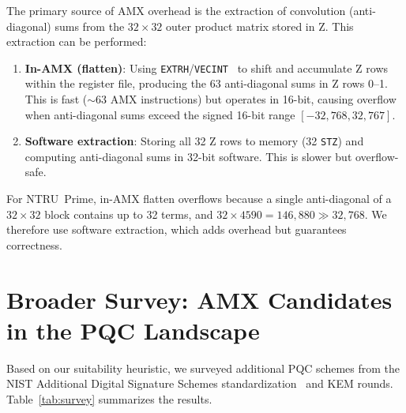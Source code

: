 \documentclass[utf8]{FrontiersinHarvard}
\begin{document}
The primary source of AMX overhead is the extraction of convolution (anti-diagonal) sums from the $32\times32$ outer product matrix stored in Z. This extraction can be performed:

\begin{enumerate}
  \item \textbf{In-AMX (flatten)}: Using \texttt{EXTRH}/\texttt{VECINT}~\cite{corsix2022amx} to shift and accumulate Z rows within the register file, producing the 63 anti-diagonal sums in Z rows 0--1. This is fast ($\sim 63$ AMX instructions) but operates in 16-bit, causing overflow when anti-diagonal sums exceed the signed 16-bit range $[-32{,}768, 32{,}767]$.
  \item \textbf{Software extraction}: Storing all 32 Z rows to memory (32 \texttt{STZ}) and computing anti-diagonal sums in 32-bit software. This is slower but overflow-safe.
\end{enumerate}

For NTRU~Prime, in-AMX flatten overflows because a single anti-diagonal of a $32 \times 32$ block contains up to 32 terms, and $32 \times 4590 = 146{,}880 \gg 32{,}768$. We therefore use software extraction, which adds overhead but guarantees correctness.


\section{Broader Survey: AMX Candidates in the PQC Landscape}
\label{sec:survey}

Based on our suitability heuristic, we surveyed additional PQC schemes from the NIST Additional Digital Signature Schemes standardization~\cite{nist2026additional} and KEM rounds. Table~\ref{tab:survey} summarizes the results.
\end{document}
